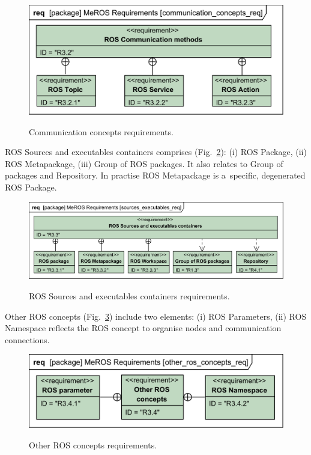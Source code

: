 \documentclass[11pt,oneside,a4paper]{report}
\begin{document}
	\begin{figure}[H]
		\centering
		\begin{center}
			{\includegraphics[scale=1.0]{diagrams/communication_concepts_req.png}}
		\end{center}
		\caption{Communication concepts requirements.} 
		\label{fig:communication_concepts_req}
	\end{figure}
	
	ROS Sources and executables containers comprises (Fig.~\ref{fig:sources_executables_req}): (i) ROS Package, (ii) ROS Metapackage, (iii) Group of ROS packages. It also relates to Group of packages and Repository. In practise ROS Metapackage is a~specific, degenerated ROS Package.
	
	\begin{figure}[H]
		\centering
		\begin{center}
			{\includegraphics[scale=1.0]{diagrams/sources_executables_req.png}}
		\end{center}
		\caption{ROS Sources and executables containers requirements.} 
		\label{fig:sources_executables_req}
	\end{figure}
	
	\pagebreak
	
	Other ROS concepts (Fig.~\ref{fig:other_ros_concepts_req}) include two elements: (i) ROS Parameters, (ii) ROS Namespace reflects the ROS concept to organise nodes and communication connections.
	
	\begin{figure}[H]
			\centering
			\begin{center}
					{\includegraphics[scale=1.0]{diagrams/other_ros_concepts_req.png}}
				\end{center}
			\caption{Other ROS concepts requirements.} 
			\label{fig:other_ros_concepts_req}
		\end{figure}
\end{document}
